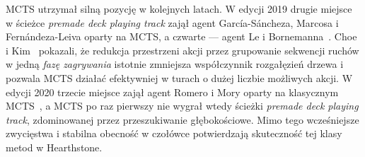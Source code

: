 MCTS utrzymał silną pozycję w kolejnych latach. W edycji 2019 drugie miejsce w ścieżce \textit{premade deck playing track} zajął agent García-Sáncheza, Marcosa i Fernándeza-Leiva oparty na MCTS, a czwarte --- agent Le i Bornemanna~\cite{hearthstone_competition}. Choe i Kim~\cite{choe2019} pokazali, że redukcja przestrzeni akcji przez grupowanie sekwencji ruchów w jedną \textit{fazę zagrywania} istotnie zmniejsza współczynnik rozgałęzień drzewa i pozwala MCTS działać efektywniej w turach o dużej liczbie możliwych akcji. W edycji 2020 trzecie miejsce zajął agent Romero i Mory oparty na klasycznym MCTS~\cite{hearthstone_competition}, a MCTS po raz pierwszy nie wygrał wtedy ścieżki \textit{premade deck playing track}, zdominowanej przez przeszukiwanie głębokościowe. Mimo tego wcześniejsze zwycięstwa i stabilna obecność w czołówce potwierdzają skuteczność tej klasy metod w Hearthstone.

